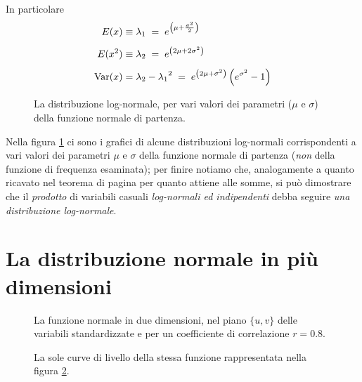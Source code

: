 In particolare
\begin{align*}
  E(x) &\equiv \lambda_1 \; = \; e^{\left( \mu +
    \frac{\sigma^2}{2} \right)} \\[1ex]
  E(x^2) &\equiv \lambda_2 \; = \; e^{\left( 2 \mu + 2
      \sigma^2 \right) } \\[1ex]
  \operatorname{Var}(x) &= \lambda_2 - {\lambda_1}^2 \; = \; e^{\left( 2
      \mu + \sigma^2 \right)} \left( e^{\sigma^2} - 1
  \right)
\end{align*}

\begin{figure}[hbtp]
  \vspace*{2ex}
  \begin{center} {
    
  } \end{center}
  \caption[La distribuzione log-normale]
    {La distribuzione log-normale, per vari valori dei
    parametri ($\mu$ e $\sigma$) della funzione normale
    di partenza.}
  \label{fig:8.lognor}
\end{figure}

Nella figura \ref{fig:8.lognor} ci sono i grafici di alcune
distribuzioni log-normali corrispondenti a vari valori dei
parametri $\mu$ e $\sigma$ della funzione normale di
partenza (\emph{non} della funzione di frequenza esaminata);
per finire notiamo che, analogamente a quanto ricavato nel
teorema di pagina \pageref{th:8.colino} per quanto attiene
alle somme, si pu\`o dimostrare che il \emph{prodotto} di
variabili casuali \emph{log-normali ed indipendenti} debba
seguire \emph{una distribuzione log-normale}.%

\section{La distribuzione normale in pi\`u dimensioni}%
\begin{figure}[htbp]
  \vspace*{2ex}
  \begin{center}  \end{center}
  \caption[Funzione normale bidimensionale]{La funzione
    normale in due dimensioni, nel piano $\{ u, v \}$ delle
    variabili standardizzate e per un coefficiente di
    correlazione $r = 0.8$.}
  \label{fig:8.bigau2}
\end{figure}
\begin{figure}[htbp]
  \vspace*{2ex}
  \begin{center}  \end{center}
  \caption[Funzione normale bidimensionale (curve di
    livello)]{La sole curve di livello della stessa funzione
      rappresentata nella figura \ref{fig:8.bigau2}.}
  \label{fig:8.bigau1}
\end{figure}

